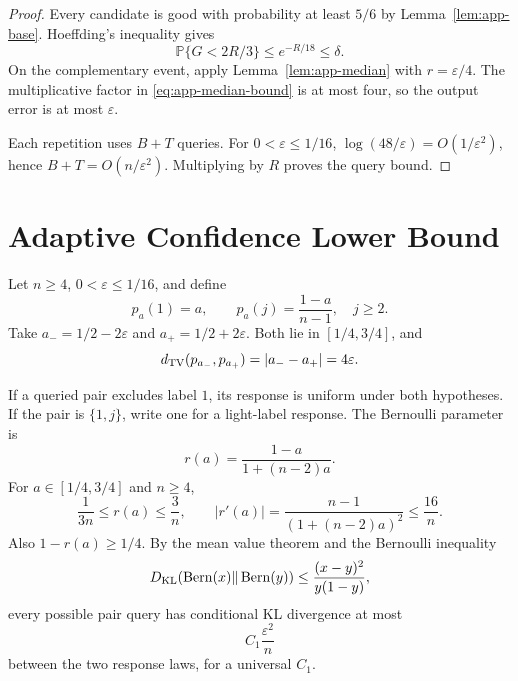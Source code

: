 \documentclass{article}
\newcommand{\Prb}{\mathbb P}
\newcommand{\TV}{d_{\rm TV}}
\begin{document}
\begin{proof}
Every candidate is good with probability at least $5/6$ by
Lemma~\ref{lem:app-base}. Hoeffding's inequality gives
\[
 \Prb\{G<2R/3\}\le e^{-R/18}\le\delta.
\]
On the complementary event, apply Lemma~\ref{lem:app-median} with
$r=\varepsilon/4$. The multiplicative factor in
\eqref{eq:app-median-bound} is at most four, so the output error is at most
$\varepsilon$.

Each repetition uses $B+T$ queries. For $0<\varepsilon\le1/16$,
$\log(48/\varepsilon)=O(1/\varepsilon^2)$, hence
$B+T=O(n/\varepsilon^2)$. Multiplying by $R$ proves the query bound.
\end{proof}

\section{Adaptive Confidence Lower Bound}
\label{app:lower}

Let $n\ge4$, $0<\varepsilon\le1/16$, and define
\begin{equation}
 p_a(1)=a,\qquad p_a(j)=\frac{1-a}{n-1},\quad j\ge2.
 \label{eq:app-hard-family}
\end{equation}
Take $a_-=1/2-2\varepsilon$ and $a_+=1/2+2\varepsilon$. Both lie in
$[1/4,3/4]$, and
\begin{equation}
 \TV(p_{a_-},p_{a_+})=|a_--a_+|=4\varepsilon.
 \label{eq:app-separation}
\end{equation}

If a queried pair excludes label $1$, its response is uniform under both
hypotheses. If the pair is $\{1,j\}$, write one for a light-label response.
The Bernoulli parameter is
\begin{equation}
 r(a)=\frac{1-a}{1+(n-2)a}.
 \label{eq:app-r}
\end{equation}
For $a\in[1/4,3/4]$ and $n\ge4$,
\begin{equation}
 \frac1{3n}\le r(a)\le\frac3n,
 \qquad
 |r'(a)|=\frac{n-1}{(1+(n-2)a)^2}\le\frac{16}{n}.
 \label{eq:app-r-bounds}
\end{equation}
Also $1-r(a)\ge1/4$. By the mean value theorem and the Bernoulli inequality
\begin{equation}
 D_{\rm KL}(\operatorname{Bern}(x)\|
 \operatorname{Bern}(y))
 \le\frac{(x-y)^2}{y(1-y)},
 \label{eq:app-bern-kl}
\end{equation}
every possible pair query has conditional KL divergence at most
\begin{equation}
 C_1\frac{\varepsilon^2}{n}
 \label{eq:app-per-query}
\end{equation}
between the two response laws, for a universal $C_1$.
\end{document}
